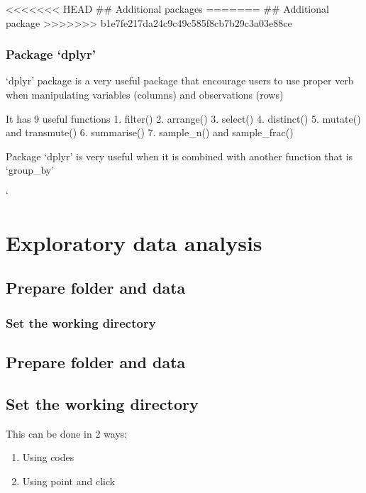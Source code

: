 \documentclass[]{book}
\providecommand{\tightlist}{%
  \setlength{\itemsep}{0pt}\setlength{\parskip}{0pt}}
\theoremstyle{definition}
\theoremstyle{definition}
\theoremstyle{remark}
\begin{document}
\textless{}\textless{}\textless{}\textless{}\textless{}\textless{}\textless{}
HEAD \#\# Additional packages ======= \#\# Additional package
\textgreater{}\textgreater{}\textgreater{}\textgreater{}\textgreater{}\textgreater{}\textgreater{}
b1e7fe217da24c9c49c585f8cb7b29c3a03e88ce

\subsection{\texorpdfstring{Package
`dplyr'}{Package dplyr}}\label{package-dplyr}

`dplyr' package is a very useful package that encourage users to use
proper verb when manipulating variables (columns) and observations
(rows)

It has 9 useful functions 1. filter() 2. arrange() 3. select() 4.
distinct() 5. mutate() and transmute() 6. summarise() 7. sample\_n() and
sample\_frac()

Package `dplyr' is very useful when it is combined with another function
that is `group\_by'

`

\chapter{Exploratory data analysis}\label{exploratory-data-analysis}

\section{Prepare folder and data}\label{prepare-folder-and-data-1}

\subsection{Set the working
directory}\label{set-the-working-directory-1}

\section{Prepare folder and data}\label{prepare-folder-and-data-2}

\section{Set the working directory}\label{set-the-working-directory-2}

This can be done in 2 ways:

\begin{enumerate}
\def\labelenumi{\arabic{enumi}.}
\tightlist
\item
  Using codes
\item
  Using point and click
\end{enumerate}
\end{document}
